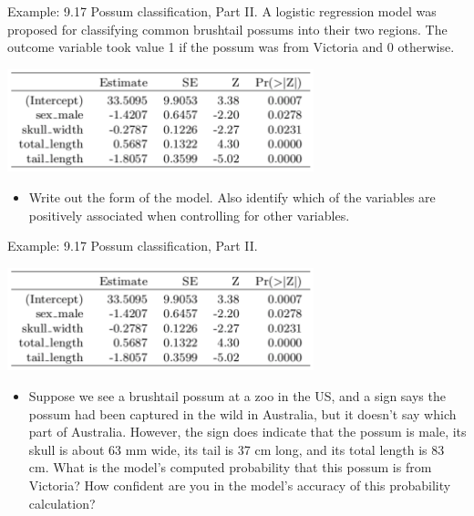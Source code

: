 \begin{frame}{Example: 9.17 Possum classification, Part II. }
    A logistic regression model was proposed for classifying common brushtail possums into their two regions. The outcome variable took value 1 if the possum was from Victoria and 0 otherwise.
    \begin{center}
        \includegraphics[width=3.5in]{images/possumprob.png}
    \end{center}
    \begin{itemize}
        \item Write out the form of the model. Also identify which of the variables are positively associated when controlling for other variables. 
    \end{itemize}
\end{frame}

\begin{frame}{Example: 9.17 Possum classification, Part II. }
    \begin{center}
        \includegraphics[width=3.5in]{images/possumprob.png}
    \end{center}
    \vspace{-18pt}\begin{itemize}
        \item Suppose we see a brushtail possum at a zoo in the US, and a sign says the possum had been captured in the wild in Australia, but it doesn’t say which part of Australia. However, the sign does indicate that the possum is male, its skull is about 63 mm wide, its tail is 37 cm long, and its total length is 83 cm. What is the model’s computed probability that this possum is from Victoria? How confident are you in the model’s accuracy of this probability calculation?
    \end{itemize}
\end{frame}
